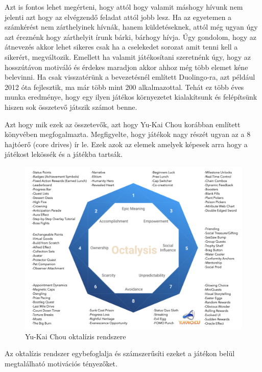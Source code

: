 Azt is fontos lehet megérteni, hogy attól hogy valamit máshogy hívunk nem jelenti azt hogy az elvégzendő feladat attól jobb lesz. Ha az egyetemen a számkérést nem zárthelyinek hívnák, hanem küldetéseknek, attól még ugyan úgy azt éreznénk hogy zárthelyit írunk bárki, bárhogy hívja. Úgy gondolom, hogy az átnevezés akkor lehet sikeres csak ha a cselekedet sorozat amit tenni kell a sikerért, megváltozik. Emellett ha valamit játékosítani szeretnénk úgy, hogy az hosszútávon motiváló és érdekes maradjon akkor ahhoz még több elemet kéne belevinni. Ha csak visszatérünk a bevezetésnél említett Duolingo-ra, azt például 2012 óta fejlesztik, ma már több mint 200 alkalmazottal. Tehát ez több éves munka eredménye, hogy egy ilyen játékos környezetet kialakítsunk és felépítsünk hiszen sok összetevő játszik számot benne. \newline

Azt hogy mik ezek az összetevők, azt hogy Yu-Kai Chou korábban említett könyvében \cite{actionablegamification} megfogalmazta. Megfigyelte, hogy játékok nagy részét ugyan az a 8 hajtóerő (core drives) ír le. Ezek azok az elemek amelyek képesek arra hogy a játékost lekössék és a játékba tartsák.

\begin{figure}[H]
    \centering
    \includegraphics[width=\linewidth]{images/gamification-framework.jpg}
    \caption{Yu-Kai Chou oktalízis rendszere}
    \label{fig:gamification-framework}
\end{figure}

Az oktalízis rendszer  egybefoglalja és számszerűsíti ezeket a játékon belül megtalálható motivációs tényezőket. \newline

